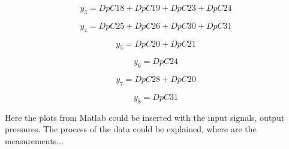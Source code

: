 \vspace{4mm}
\begin {equation}
    y_3 = DpC18 + DpC19 + DpC23 + DpC24 
\end{equation}

\vspace{4mm}
\begin {equation}
    y_4 = DpC25 + DpC26 + DpC30 + DpC31 
\end{equation}

\vspace{4mm}
\begin {equation}
     y_5 = DpC20 + DpC21  
\end{equation}

\vspace{4mm}
\begin {equation}
     y_6 = DpC24
\end{equation}

\vspace{4mm}
\begin {equation}
     y_7 = DpC28 + DpC20 
\end{equation}

\vspace{4mm}
\begin {equation}
     y_8 = DpC31 
\end{equation}


Here the plots from Matlab could be inserted with the input signals, output pressures. The process of the data could be explained, where are the measurements...

